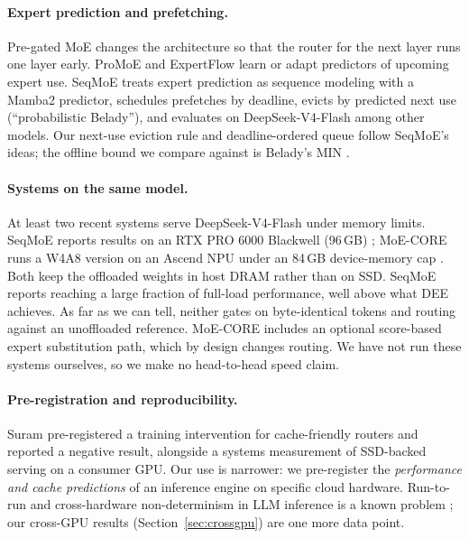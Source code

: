 \documentclass[11pt]{article}
\newcommand{\dee}{\textsc{DEE}}
\begin{document}
\paragraph{Expert prediction and prefetching.}
Pre-gated MoE \citep{hwang2024pregated} changes the architecture so that the
router for the next layer runs one layer early. ProMoE \citep{song2024promoe} and
ExpertFlow \citep{he2024expertflow} learn or adapt predictors of upcoming expert
use. SeqMoE \citep{wang2026seqmoe} treats expert prediction as sequence modeling
with a Mamba2 predictor, schedules prefetches by deadline, evicts by predicted
next use (``probabilistic Belady''), and evaluates on DeepSeek-V4-Flash among
other models. Our next-use eviction rule and deadline-ordered queue follow
SeqMoE's ideas; the offline bound we compare against is Belady's MIN
\citep{belady1966study}.

\paragraph{Systems on the same model.}
At least two recent systems serve DeepSeek-V4-Flash under memory limits. SeqMoE
reports results on an RTX PRO 6000 Blackwell (96\,GB) \citep{wang2026seqmoe};
MoE-CORE runs a W4A8 version on an Ascend NPU under an 84\,GB device-memory cap
\citep{yang2026moecore}. Both keep the offloaded weights in host DRAM rather than
on SSD. SeqMoE reports reaching a large fraction of full-load performance, well
above what \dee{} achieves. As far as we can tell, neither gates on
byte-identical tokens and routing against an unoffloaded reference. MoE-CORE
includes an optional score-based expert substitution path, which by design
changes routing. We have not run these systems ourselves, so we make no
head-to-head speed claim.

\paragraph{Pre-registration and reproducibility.}
Suram \citep{suram2026cacheable} pre-registered a training intervention for
cache-friendly routers and reported a negative result, alongside a systems
measurement of SSD-backed serving on a consumer GPU. Our use is narrower: we
pre-register the \emph{performance and cache predictions} of an inference
engine on specific cloud hardware. Run-to-run and cross-hardware
non-determinism in LLM inference is a known problem
\citep{yuan2025fp32}; our cross-GPU results (Section~\ref{sec:crossgpu}) are one
more data point.
\end{document}
